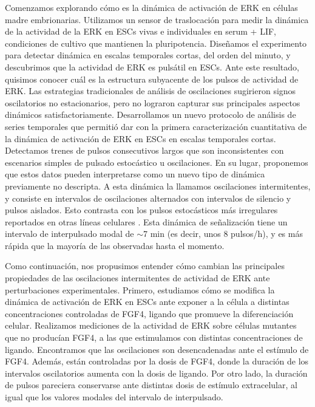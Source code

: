\documentclass[./main.tex]{subfiles}
\begin{document}
Comenzamos explorando cómo es la dinámica de activación de ERK en células madre embrionarias. Utilizamos un sensor de traslocación para medir la dinámica de la actividad de la ERK en ESCs vivas e individuales en serum + LIF, condiciones de cultivo que mantienen la pluripotencia. Diseñamos el experimento para detectar dinámica en escalas temporales cortas, del orden del minuto, y descubrimos que la actividad de ERK es pulsátil en ESCs. Ante este resultado, quisimos conocer cuál es la estructura subyacente de los pulsos de actividad de ERK. Las estrategias tradicionales de análisis de oscilaciones sugirieron signos oscilatorios no estacionarios, pero no lograron capturar sus principales aspectos dinámicos satisfactoriamente. Desarrollamos un nuevo protocolo de análisis de series temporales que permitió dar con la primera caracterización cuantitativa de la dinámica de activación de ERK en ESCs en escalas temporales cortas. Detectamos trenes de pulsos consecutivos largos que son inconsistentes con escenarios simples de pulsado estocástico u oscilaciones. En su lugar, proponemos que estos datos pueden interpretarse como un nuevo tipo de dinámica previamente no descripta. A esta dinámica la llamamos oscilaciones intermitentes, y consiste en intervalos de oscilaciones alternados con intervalos de silencio y pulsos aislados. Esto contrasta con los pulsos estocásticos más irregulares reportados en otras líneas celulares \cite{Albeck2013,Aoki2013,Goglia2020}. Esta dinámica de señalización tiene un intervalo de interpulsado modal de $\sim$7 min (es decir, unos 8 pulsos/h), y es más rápida que la mayoría de las observadas hasta el momento.


Como continuación, nos propusimos entender cómo cambian las principales propiedades de las oscilaciones intermitentes de actividad de ERK ante perturbaciones experimentales. Primero, estudiamos  cómo se modifica la dinámica de activación de ERK en ESCs ante exponer a la célula a distintas concentraciones controladas de FGF4, ligando que promueve la diferenciación celular. Realizamos mediciones de la actividad de ERK sobre células mutantes que no producían FGF4, a las que estimulamos con distintas concentraciones de ligando. Encontramos que las oscilaciones son desencadenadas ante el estímulo de FGF4. Además, están controladas por la dosis de FGF4, donde la duración de los intervalos oscilatorios aumenta con la dosis de ligando. Por otro lado, la duración de pulsos pareciera conservarse ante distintas dosis de estímulo extracelular, al igual que los valores modales del intervalo de interpulsado. 
\end{document}
